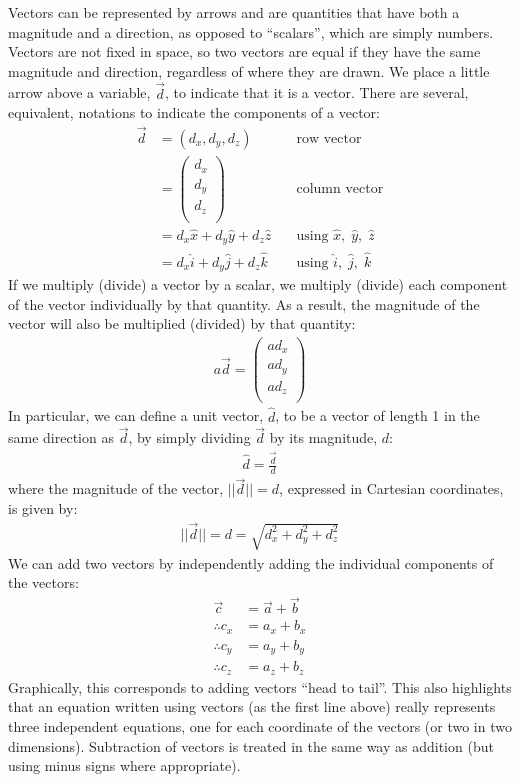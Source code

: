 \begin{chapterSummary}
Vectors can be represented by arrows and are quantities that have both a magnitude and a direction, as opposed to ``scalars'', which are simply numbers. Vectors are not fixed in space, so two vectors are equal if they have the same magnitude and direction, regardless of where they are drawn. We place a little arrow above a variable, $\vec d$, to indicate that it is a vector. There are several, equivalent, notations to indicate the components of a vector:
\begin{align*}
\vec d &= (d_x,d_y, d_z)\quad&\text{row vector}\\
       &=\begin{pmatrix}
           d_x \\
           d_y \\
           d_z\\
         \end{pmatrix}\quad&\text{column vector}\\
         &= d_x\hat x +d_y \hat y +d_z \hat z\quad&\text{using }\hat x,\;\hat y,\;\hat z\\
         &=d_x\hat i +d_y \hat j+d_z \hat k \quad&\text{using }\hat i,\;\hat j,\;\hat k
\end{align*}
If we multiply (divide) a vector by a scalar, we multiply (divide) each component of the vector individually by that quantity. As a result, the magnitude of the vector will also be multiplied (divided) by that quantity:
\begin{align*}
a\vec d = \begin{pmatrix}
           ad_x \\
           ad_y \\
           ad_z \\
         \end{pmatrix}
\end{align*}
In particular, we can define a unit vector, $\hat d$, to be a vector of length 1 in the same direction as $\vec d$, by simply dividing $\vec d$ by its magnitude, $d$:
\begin{align*}
\hat d = \frac{\vec d}{d}
\end{align*}
where the magnitude of the vector, $||\vec d|| = d$, expressed in Cartesian coordinates, is given by:
\begin{align*}
||\vec d|| = d =\sqrt{d_x^2+d_y^2+d_z^2}
\end{align*}
We can add two vectors by independently adding the individual components of the vectors:
\begin{align*}
\vec c &= \vec a + \vec b\\
\therefore c_x &= a_x + b_x\\
\therefore c_y &= a_y + b_y\\
\therefore c_z &= a_z + b_z
\end{align*}
Graphically, this corresponds to adding vectors ``head to tail''. This also highlights that an equation written using vectors (as the first line above) really represents three independent equations, one for each coordinate of the vectors (or two in two dimensions). Subtraction of vectors is treated in the same way as addition (but using minus signs where appropriate).


\end{chapterSummary}
